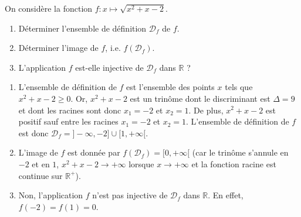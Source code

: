 \documentclass[a4paper, 11pt,openany]{book}%
\newtheorem[L]{thm}{Théorème}[section]
\newtheorem[M]{propo}[thm]{Proposition}
\newtheorem[M]{prop}[thm]{Propriété}
\newtheorem[M]{coro}[thm]{Corollaire}
\newtheorem[M]{lem}[thm]{Lemme}
\newtheorem[M,bodystyle=]{defi}[thm]{Définition}
\newtheorem[M,bodystyle=]{remark}[thm]{Remarque}
\newtheorem[M,bodystyle=]{met}[thm]{Méthode}
\newtheorem[M,bodystyle=]{ret}[thm]{A retenir}
\newtheorem[M,bodystyle=]{idee}[thm]{Idée}
\newtheorem[style=S,underline=false,bodystyle=]{exem}[thm]{Exemple}
\newtheorem[S,underline=false,bodystyle=]{exo}[thm]{Exercice}
\newtheorem[S,underline=false,bodystyle=]{appli}[thm]{Application}
\newtheorem[S,underline=false,bodystyle=]{sol}[thm]{Solution}
\newtheorem[S,underline=false,bodystyle=]{hypo}[thm]{Hypothesis}
\newtheorem[S,underline=false,bodystyle=]{nota}[thm]{Notation}
\newcommand{\R}{\mathbb{R}}
\newcommand{\calD}{\mathcal{D}}
\begin{document}
\begin{exo}
On considère la fonction 
$ f : x \mapsto \sqrt{x^2 + x - 2}$.
\begin{enumerate}
\item Déterminer l'ensemble de définition $\calD_f$ de $f$.
\item Déterminer l'image de $f$, i.e. $f(\calD_f)$.
\item L'application $f$ est-elle injective de $\calD_f$ dans $\R$ ?
\end{enumerate}
\end{exo}


\begin{sol}
\begin{enumerate}
\item L'ensemble de définition de $f$ est l'ensemble des points $x$ tels que $x^2 + x -2 \geqslant 0$. Or, $x^2 + x -2$ est un trinôme dont le discriminant est $\Delta = 9$ et dont les racines sont donc $x_1 = -2$ et $x_2 =1$. De plus, $x^2 +x -2$ est positif sauf entre les racines $x_1 = -2$ et $x_2= 1$. L'ensemble de définition de $f$ est donc $\calD_f = ]-\infty,-2] \cup [1, +\infty[$.
\item L'image de $f$ est donnée par $f(\calD_f) = [0,+\infty[$ (car le trinôme s'annule en $-2$ et en $1$, $x^2+x-2 \to + \infty$ lorsque $x \to + \infty$ et la fonction racine est continue sur $\R^+$).
\item Non, l'application $f$ n'est pas injective de $\calD_f$ dans $\R$. En effet, $f(-2) =  f(1)= 0$.
\end{enumerate}
\end{sol}
\end{document}
